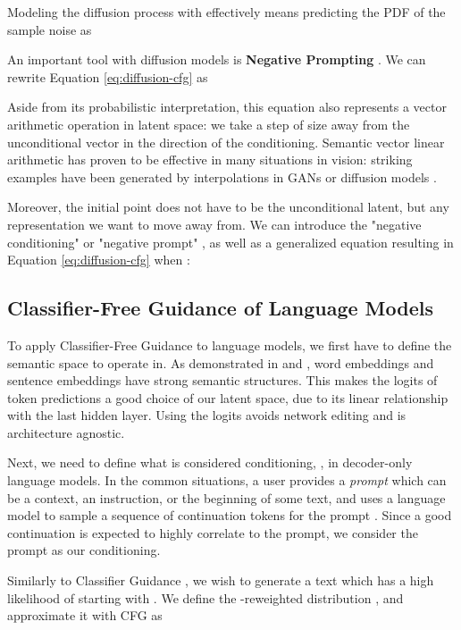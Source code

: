 \documentclass{article}
\begin{document}
Modeling the diffusion process with  effectively means predicting the PDF of the sample noise  as



An important tool with diffusion models is \textbf{Negative Prompting} \cite{compositionalprompts,negprompt,crowson2022vqgan,stablediffusion}. We can rewrite Equation \ref{eq:diffusion-cfg} as



Aside from its probabilistic interpretation, this equation also represents a vector arithmetic operation in latent space: we take a step of size  away from the unconditional vector in the direction of the conditioning. Semantic vector linear arithmetic has proven to be effective in many situations in vision: striking examples have been generated by interpolations in GANs or diffusion models \cite{editgan,ddim,neuralphotoshop}. 

Moreover, the initial point does not have to be the unconditional latent, but any representation we want to move away from. We can introduce the "negative conditioning" or "negative prompt" , as well as a generalized equation resulting in Equation \ref{eq:diffusion-cfg} when :



\subsection{Classifier-Free Guidance of Language Models}
\label{sct:methodology:guidance-llm}

To apply Classifier-Free Guidance to language models, we first have to define the semantic space to operate in. As demonstrated in \cite{word2vec,glove} and \cite{bert,gpt1}, word embeddings and sentence embeddings have strong semantic structures. This makes the logits of token predictions a good choice of our latent space, due to its linear relationship with the last hidden layer. Using the logits avoids network editing \cite{leace} and is architecture agnostic.

Next, we need to define what is considered conditioning, , in decoder-only language models. In the common situations, a user provides a \textit{prompt}  which can be a context, an instruction, or the beginning of some text, and uses a language model to sample a sequence of continuation tokens  for the prompt . Since a good continuation is expected to highly correlate to the prompt, we consider the prompt as our conditioning.

Similarly to Classifier Guidance \cite{dathathri2019plug, yang2021fudge, spangher2023sequentially}, we wish to generate a text  which has a high likelihood of starting with . We define the -reweighted distribution , and approximate it with CFG as 
\end{document}
